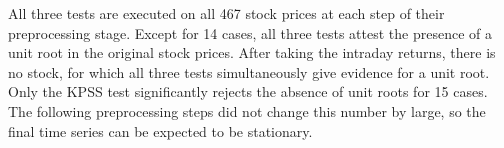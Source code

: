 All three tests are executed on all 467 stock prices at each step of their preprocessing stage. Except for 14 cases, all three tests attest the presence of a unit root in the original stock prices. After taking the intraday returns, there is no stock, for which all three tests simultaneously give evidence for a unit root. Only the KPSS test significantly rejects the absence of unit roots for 15 cases. The following preprocessing steps did not change this number by large, so the final time series can be expected to be stationary.







